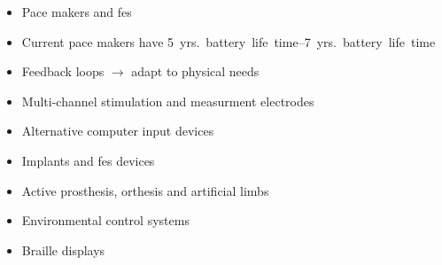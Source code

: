 \begin{frame}
    \begin{itemize}
        \item Pace makers and \ac{fes}
        \item Current pace makers have \SIrange{5}{7}{yrs.} battery life time
        \item Feedback loops $\rightarrow$ adapt to physical needs
        \item Multi-channel stimulation and measurment electrodes
    \end{itemize}
\end{frame}

\begin{frame}
\end{frame}

\begin{frame}
    \begin{itemize}
        \item Alternative computer input devices
        \item Implants and \acs{fes} devices
        \item Active prosthesis, orthesis and artificial limbs
        \item Environmental control systems
        \item Braille displays
    \end{itemize}
\end{frame}